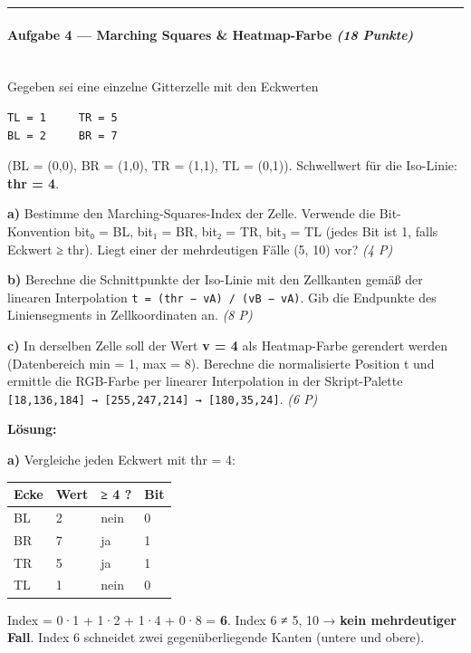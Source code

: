 \documentclass[11pt, a4paper]{article}
\begin{document}
\noindent\textcolor{rulegray}{\rule{\linewidth}{0.4pt}}


\paragraph{Aufgabe 4 — Marching Squares \& Heatmap-Farbe \textit{(18 Punkte)}}\mbox{}\\[2pt]

Gegeben sei eine einzelne Gitterzelle mit den Eckwerten


\begin{lstlisting}
TL = 1     TR = 5
BL = 2     BR = 7
\end{lstlisting}


(BL = (0,0), BR = (1,0), TR = (1,1), TL = (0,1)). Schwellwert für die Iso-Linie: \textbf{thr = 4}.


\textbf{a)} Bestimme den Marching-Squares-Index der Zelle. Verwende die Bit-Konvention bit₀ = BL, bit₁ = BR, bit₂ = TR, bit₃ = TL (jedes Bit ist 1, falls Eckwert ≥ thr). Liegt einer der mehrdeutigen Fälle (5, 10) vor? \textit{(4 P)}


\textbf{b)} Berechne die Schnittpunkte der Iso-Linie mit den Zellkanten gemäß der linearen Interpolation \texttt{t = (thr − vA) / (vB − vA)}. Gib die Endpunkte des Liniensegments in Zellkoordinaten an. \textit{(8 P)}


\textbf{c)} In derselben Zelle soll der Wert \textbf{v = 4} als Heatmap-Farbe gerendert werden (Datenbereich min = 1, max = 8). Berechne die normalisierte Position t und ermittle die RGB-Farbe per linearer Interpolation in der Skript-Palette \texttt{[18,136,184] → [255,247,214] → [180,35,24]}. \textit{(6 P)}


\textbf{Lösung:}


\textbf{a)} Vergleiche jeden Eckwert mit thr = 4:



{\small
\begin{tabularx}{\linewidth}{XXXX}
\hline
\rowcolor{tableheadbg}
{\color{white}\textbf{Ecke}} & {\color{white}\textbf{Wert}} & {\color{white}\textbf{≥ 4 ?}} & {\color{white}\textbf{Bit}} \\[2pt]
\hline
\endhead
\hline
\endfoot
BL & 2 & nein & 0 \\
BR & 7 & ja & 1 \\
TR & 5 & ja & 1 \\
TL & 1 & nein & 0 \\
\end{tabularx}
}


Index = 0·1 + 1·2 + 1·4 + 0·8 = \textbf{6}. Index 6 ≠ 5, 10 → \textbf{kein mehrdeutiger Fall}. Index 6 schneidet zwei gegenüberliegende Kanten (untere und obere).
\end{document}
